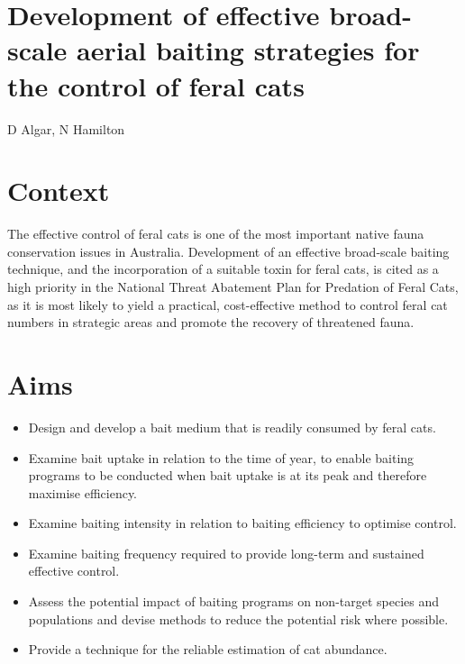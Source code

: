 \documentclass[version=last,
    paper=a4, %
    10pt, %
    usenames,
    dvipsnames,
    oneside, %
    headings=openany, %
    DIV=15 %
]{scrbook}
\begin{document}
\section*{Development of effective broad-scale aerial baiting strategies for the
control of feral cats
}

D Algar, N Hamilton


\section*{Context}
The effective control of feral cats is one of the most important native
fauna conservation issues in Australia. Development of an effective
broad-scale baiting technique, and the incorporation of a suitable toxin
for feral cats, is cited as a high priority in the National Threat
Abatement Plan for Predation of Feral Cats, as it is most likely to
yield a practical, cost-effective method to control feral cat numbers in
strategic areas and promote the recovery of threatened fauna.



\section*{Aims}
\begin{itemize}
\itemsep1pt\parskip0pt
\item
  Design and develop a bait medium that is readily consumed by feral
  cats.
\item
  Examine bait uptake in relation to the time of year, to enable baiting
  programs to be conducted when bait uptake is at its peak and therefore
  maximise efficiency.
\item
  Examine baiting intensity in relation to baiting efficiency to
  optimise control.
\item
  Examine baiting frequency required to provide long-term and sustained
  effective control.
\item
  Assess the potential impact of baiting programs on non-target species
  and populations and devise methods to reduce the potential risk where
  possible.
\item
  Provide a technique for the reliable estimation of cat abundance.
\end{itemize}
\end{document}
